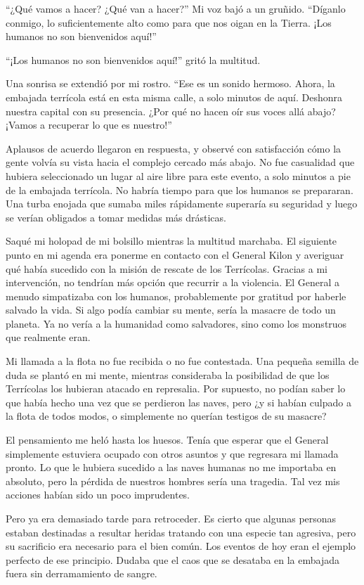 \documentclass[spanish,12pt,a4paper,oneside,titlepage]{book}
\begin{document}
    ``¿Qué vamos a hacer? ¿Qué van a hacer?'' Mi voz bajó a un gruñido. ``Díganlo conmigo, lo suficientemente alto como para que nos oigan en la Tierra. ¡Los humanos no son bienvenidos aquí!''

    ``¡Los humanos no son bienvenidos aquí!'' gritó la multitud.

    Una sonrisa se extendió por mi rostro. ``Ese es un sonido hermoso. Ahora, la embajada terrícola está en esta misma calle, a solo minutos de aquí. Deshonra nuestra capital con su presencia. ¿Por qué no hacen oír sus voces allá abajo? ¡Vamos a recuperar lo que es nuestro!''

    Aplausos de acuerdo llegaron en respuesta, y observé con satisfacción cómo la gente volvía su vista hacia el complejo cercado más abajo. No fue casualidad que hubiera seleccionado un lugar al aire libre para este evento, a solo minutos a pie de la embajada terrícola. No habría tiempo para que los humanos se prepararan. Una turba enojada que sumaba miles rápidamente superaría su seguridad y luego se verían obligados a tomar medidas más drásticas.

    Saqué mi holopad de mi bolsillo mientras la multitud marchaba. El siguiente punto en mi agenda era ponerme en contacto con el General Kilon y averiguar qué había sucedido con la misión de rescate de los Terrícolas. Gracias a mi intervención, no tendrían más opción que recurrir a la violencia. El General a menudo simpatizaba con los humanos, probablemente por gratitud por haberle salvado la vida. Si algo podía cambiar su mente, sería la masacre de todo un planeta. Ya no vería a la humanidad como salvadores, sino como los monstruos que realmente eran.

    Mi llamada a la flota no fue recibida o no fue contestada. Una pequeña semilla de duda se plantó en mi mente, mientras consideraba la posibilidad de que los Terrícolas los hubieran atacado en represalia. Por supuesto, no podían saber lo que había hecho una vez que se perdieron las naves, pero ¿y si habían culpado a la flota de todos modos, o simplemente no querían testigos de su masacre?

    El pensamiento me heló hasta los huesos. Tenía que esperar que el General simplemente estuviera ocupado con otros asuntos y que regresara mi llamada pronto. Lo que le hubiera sucedido a las naves humanas no me importaba en absoluto, pero la pérdida de nuestros hombres sería una tragedia. Tal vez mis acciones habían sido un poco imprudentes.

    Pero ya era demasiado tarde para retroceder. Es cierto que algunas personas estaban destinadas a resultar heridas tratando con una especie tan agresiva, pero su sacrificio era necesario para el bien común. Los eventos de hoy eran el ejemplo perfecto de ese principio. Dudaba que el caos que se desataba en la embajada fuera sin derramamiento de sangre.
\end{document}
